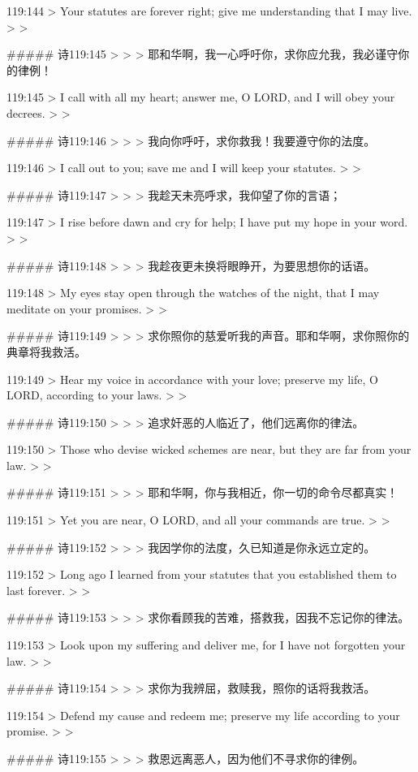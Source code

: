 119:144
> Your statutes are forever right; give me understanding that I may live.
>
> 


##### 诗119:145
> 
>
> 耶和华啊，我一心呼吁你，求你应允我，我必谨守你的律例！


119:145
> I call with all my heart; answer me, O LORD, and I will obey your decrees.
>
> 


##### 诗119:146
> 
>
> 我向你呼吁，求你救我！我要遵守你的法度。


119:146
> I call out to you; save me and I will keep your statutes.
>
> 


##### 诗119:147
> 
>
> 我趁天未亮呼求，我仰望了你的言语；


119:147
> I rise before dawn and cry for help; I have put my hope in your word.
>
> 


##### 诗119:148
> 
>
> 我趁夜更未换将眼睁开，为要思想你的话语。


119:148
> My eyes stay open through the watches of the night, that I may meditate on your promises.
>
> 


##### 诗119:149
> 
>
> 求你照你的慈爱听我的声音。耶和华啊，求你照你的典章将我救活。


119:149
> Hear my voice in accordance with your love; preserve my life, O LORD, according to your laws.
>
> 


##### 诗119:150
> 
>
> 追求奸恶的人临近了，他们远离你的律法。


119:150
> Those who devise wicked schemes are near, but they are far from your law.
>
> 


##### 诗119:151
> 
>
> 耶和华啊，你与我相近，你一切的命令尽都真实！


119:151
> Yet you are near, O LORD, and all your commands are true.
>
> 


##### 诗119:152
> 
>
> 我因学你的法度，久已知道是你永远立定的。


119:152
> Long ago I learned from your statutes that you established them to last forever.
>
> 


##### 诗119:153
> 
>
> 求你看顾我的苦难，搭救我，因我不忘记你的律法。


119:153
> Look upon my suffering and deliver me, for I have not forgotten your law.
>
> 


##### 诗119:154
> 
>
> 求你为我辨屈，救赎我，照你的话将我救活。


119:154
> Defend my cause and redeem me; preserve my life according to your promise.
>
> 


##### 诗119:155
> 
>
> 救恩远离恶人，因为他们不寻求你的律例。


